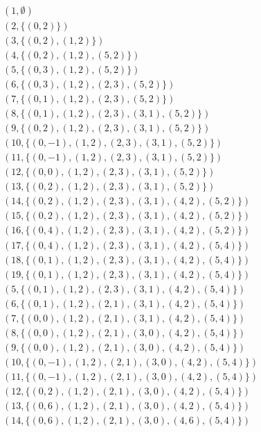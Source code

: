 \documentclass[twoside]{article}
\begin{document}
\begin{ej}
\begin{align*}
&(1, \emptyset)\\
&(2,\{(0,2)\})\\
&(3, \{(0,2),(1,2)\})\\
&(4,\{(0,2),(1,2),(5,2)\})\\
&(5,\{(0,3),(1,2),(5,2)\})\\
&(6,\{(0,3),(1,2),(2,3),(5,2)\})\\
&(7,\{(0,1),(1,2),(2,3),(5,2)\})\\
&(8,\{(0,1),(1,2),(2,3),(3,1),(5,2)\})\\
&(9,\{(0,2),(1,2),(2,3),(3,1),(5,2)\})\\
&(10,\{(0,-1),(1,2),(2,3),(3,1),(5,2)\})\\
&(11,\{(0,-1),(1,2),(2,3),(3,1),(5,2)\})\\
&(12,\{(0,0),(1,2),(2,3),(3,1),(5,2)\})\\
&(13,\{(0,2),(1,2),(2,3),(3,1),(5,2)\})\\
&(14,\{(0,2),(1,2),(2,3),(3,1),(4,2),(5,2)\})\\
&(15,\{(0,2),(1,2),(2,3),(3,1),(4,2),(5,2)\})\\
&(16,\{(0,4),(1,2),(2,3),(3,1),(4,2),(5,2)\})\\
&(17,\{(0,4),(1,2),(2,3),(3,1),(4,2),(5,4)\})\\
&(18,\{(0,1),(1,2),(2,3),(3,1),(4,2),(5,4)\})\\
&(19,\{(0,1),(1,2),(2,3),(3,1),(4,2),(5,4)\})\\
&(5,\{(0,1),(1,2),(2,3),(3,1),(4,2),(5,4)\})\\
&(6,\{(0,1),(1,2),(2,1),(3,1),(4,2),(5,4)\})\\
&(7,\{(0,0),(1,2),(2,1),(3,1),(4,2),(5,4)\})\\
&(8,\{(0,0),(1,2),(2,1),(3,0),(4,2),(5,4)\})\\
&(9,\{(0,0),(1,2),(2,1),(3,0),(4,2),(5,4)\})\\
&(10,\{(0,-1),(1,2),(2,1),(3,0),(4,2),(5,4)\})\\
&(11,\{(0,-1),(1,2),(2,1),(3,0),(4,2),(5,4)\})\\
&(12,\{(0,2),(1,2),(2,1),(3,0),(4,2),(5,4)\})\\
&(13,\{(0,6),(1,2),(2,1),(3,0),(4,2),(5,4)\})\\
&(14,\{(0,6),(1,2),(2,1),(3,0),(4,6),(5,4)\})\\
\end{align*}


\end{ej}
\end{document}
